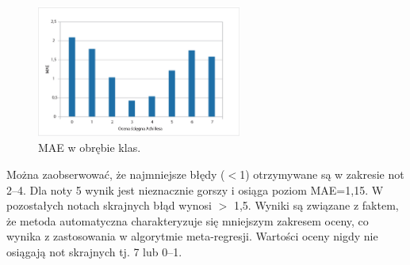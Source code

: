\begin{figure}[]
	\centering
	\includegraphics[width=0.6\textwidth]{figures/cmScores_summary.jpg}
	\caption{MAE w obrębie klas.}\label{fig:cmscores}
\end{figure}

Można zaobserwować, że najmniejsze błędy ($<$1) otrzymywane są w zakresie not 2--4. Dla noty 5 wynik jest nieznacznie gorszy i osiąga poziom MAE=1,15. W pozostałych notach skrajnych błąd wynosi $>$ 1,5. Wyniki są związane z faktem, że metoda automatyczna charakteryzuje się mniejszym zakresem oceny, co wynika z zastosowania w algorytmie meta-regresji. Wartości oceny nigdy nie osiągają not skrajnych tj. 7 lub 0--1. 

